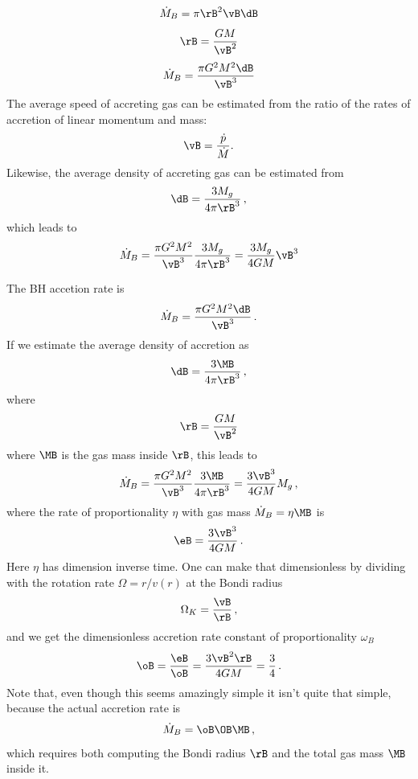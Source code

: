 \documentclass[paper=a4,fontsize=11pt]{scrartcl}
\numberwithin{equation}{section}		%
\numberwithin{figure}{section}			%
\numberwithin{table}{section}				%
\begin{document}
\begin{equation}
    \dot{M}_{B}=\pi \rB^2 \vB \dB
\end{equation}
\begin{equation}
    \rB=\frac{G M}{\vB^2}
\end{equation}
\begin{equation}
    \dot{M}_{B}=\frac{\pi G^2 M^2 \dB}{\vB^3} 
\end{equation}
The average speed of accreting gas can be estimated from the ratio of the rates of accretion of linear momentum and mass:
\begin{equation}
    \vB=\frac{\dot{p}}{\dot{M}} .
\end{equation}
Likewise, the average density of accreting gas can be estimated from
\begin{equation}
    \dB=\frac{3 M_g}{4\pi \rB^3} \,,
\end{equation}
which leads to
\begin{equation}
    \dot{M}_{B}
    = \frac{\pi G^2 M^2}{\vB^3} \frac{3 M_g}{4\pi \rB^3} 
    = \frac{3 M_g}{4 G M} \vB^3
\end{equation}

The BH accetion rate is
\begin{equation}
    \dot{M}_{B}=\frac{\pi G^2 M^2 \dB}{\vB^3} \,.
\end{equation}
If we estimate the average density of accretion as
\begin{equation}
    \dB=\frac{3 \MB}{4\pi \rB^3} \,,
\end{equation}
where
\begin{equation}
    \rB=\frac{G M}{\vB^2}
\end{equation}
where $\MB$ is the gas mass inside $\rB$, this leads to
\begin{equation}
    \dot{M}_{B}
    = \frac{\pi G^2 M^2}{\vB^3} \frac{3 \MB}{4\pi \rB^3} 
    = \frac{3 \vB^3}{4 G M} M_g \,,
\end{equation}
where the rate of proportionality $\eta$ with gas mass $\dot{M}_B=\eta \MB$ is
\begin{equation}
    \eB= \frac{3 \vB^3}{4 G M} \,.
\end{equation}
Here $\eta$ has dimension inverse time.  One can make that dimensionless by dividing with the rotation rate $\Omega=r/v(r)$ at the Bondi radius
\begin{equation}
    \Omega_K = \frac{\vB}{\rB} \,,
\end{equation}
and we get the dimensionless accretion rate constant of proportionality $\omega_B$
\begin{equation}
    \oB = \frac{\eB}{\oB}=  \frac{3 \vB^2 \rB}{4 G M} = \frac{3}{4}\,.
\end{equation}
Note that, even though this seems amazingly simple it isn't quite that simple, because the actual accretion rate is
\begin{equation}
    \dot{M}_{B} = \oB\OB \MB\,,
\end{equation}
which requires both computing the Bondi radius $\rB$ and the total gas mass $\MB$ inside it.
\end{document}

